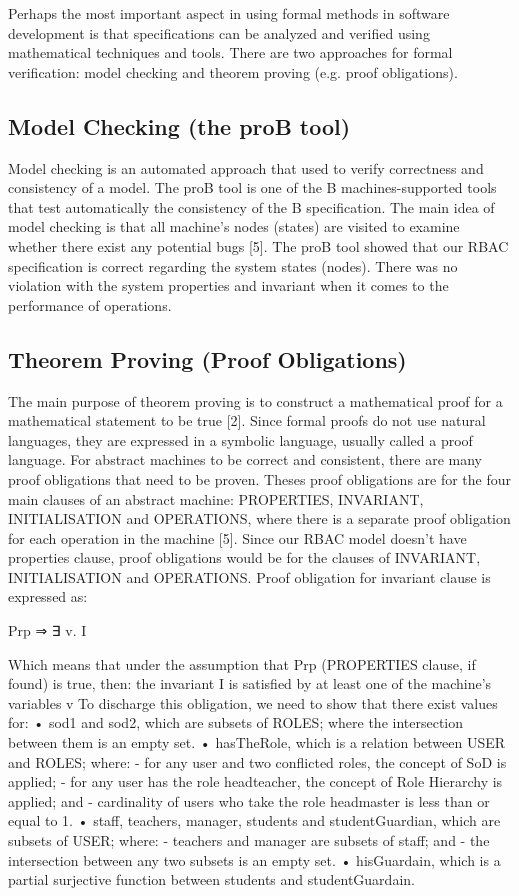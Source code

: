      Perhaps the most important aspect in using formal methods in software development is that specifications can be analyzed and verified using mathematical techniques and tools.  There are two approaches for formal verification: model checking and theorem proving (e.g. proof obligations).

\subsection{Model Checking (the proB tool)}
 
Model checking is an automated approach that used to verify correctness and consistency of a model.  The proB tool is one of the B machines-supported tools that test automatically the consistency of the B specification.  The main idea of model checking is that all machine’s nodes (states) are visited to examine whether there exist any potential bugs [5].
      The proB tool showed that our RBAC specification is correct regarding the system states (nodes).  There was no violation with the system properties and invariant when it comes to the performance of operations.

\subsection{Theorem Proving (Proof Obligations)}
      The main purpose of theorem proving is to construct a mathematical proof for a mathematical statement to be true [2].  Since formal proofs do not use natural languages, they are expressed in a symbolic language, usually called a proof language.  For abstract machines to be correct and consistent, there are many proof obligations that need to be proven.  Theses proof obligations are for the four main clauses of an abstract machine: PROPERTIES, INVARIANT, INITIALISATION and OPERATIONS, where there is a separate proof obligation for each operation in the machine [5]. 
      Since our RBAC model doesn’t have properties clause, proof obligations would be for the clauses of INVARIANT, INITIALISATION and OPERATIONS.  Proof obligation for invariant clause is expressed as:

Prp ⇒ ∃ v. I

      Which means that under the assumption that Prp (PROPERTIES clause, if found) is true, then: the invariant I is satisfied by at least one of the machine’s variables v
     To discharge this obligation, we need to show that there exist values for:
•	sod1 and sod2, which are subsets of ROLES; where the intersection between them is an empty set.
•	hasTheRole, which is a relation between USER and ROLES; where:
-	for any user and two conflicted roles, the concept of SoD is applied;
-	for any user has the role headteacher, the concept of Role Hierarchy is applied; and
-	cardinality of users who take the role headmaster is less than or equal to 1. 
•	staff, teachers, manager, students and studentGuardian, which are subsets of USER; where:
-	teachers and manager are subsets of staff; and
-	the intersection between any two subsets is an empty set. 
•	hisGuardain, which is a partial surjective function between students and studentGuardain.

